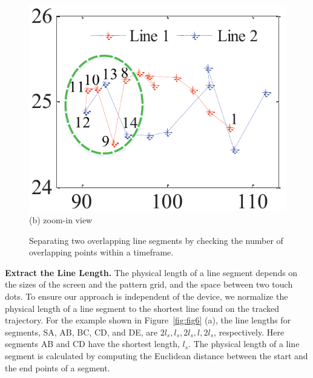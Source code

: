\begin{figure}[!t]
{\begin{minipage}[b]{0.225\textwidth}
                \includegraphics[width=\textwidth]{fig/line-identification2.pdf}\\
                \centering  (b) zoom-in view
                \end{minipage}
            }
            \caption{Separating two overlapping line segments by checking the number of overlapping points within a timeframe.}
            \label{fig:line-idenfication}
            \vspace{-3mm}
        \end{figure}
        \noindent \textbf{Extract the Line Length.}
        The physical length of a line segment depends
        on the sizes of the screen and the pattern grid, and the space between two touch dots.
        To ensure our approach is independent of the device, we normalize the physical length of a line segment to the
        shortest line found on the tracked trajectory. For the
        example shown in Figure~\ref{fig:fig6} (a), the line lengths for segments, SA, AB, BC, CD, and DE, are $2l_{s},l_{s},2l_{s},l,2l_{s}$, respectively.
        Here segments AB and CD have the shortest length, $l_s$. The physical length of a line segment is calculated by computing the
        Euclidean distance between the start and the end points of a segment.

